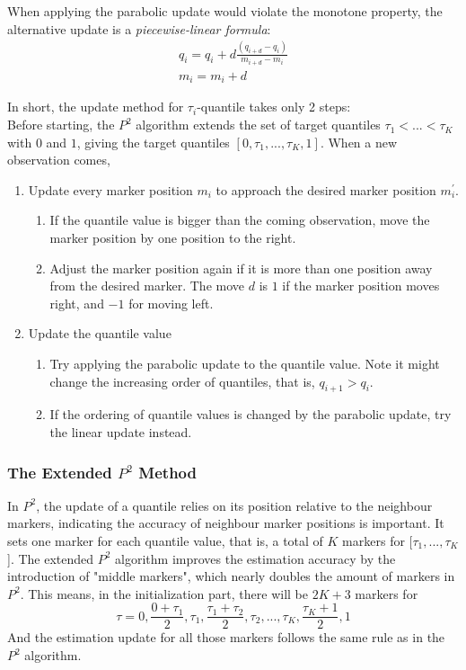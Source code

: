 When applying the parabolic update would violate the monotone property, the alternative update is a \textit{piecewise-linear formula}:
\begin{equation}
    \begin{array}{l}
    q_{i}=q_{i}+d \frac{\left(q_{i+d}-q_{i}\right)}{m_{i+d}-m_{i}} \\
    m_{i}=m_{i}+d
    \end{array}
\end{equation}

In short, the update method for $\tau_i$-quantile takes only 2 steps:\\
Before starting, the $P^2$ algorithm extends the set of target quantiles $\tau_1 <... < \tau_K$ with $0$ and $1$, giving the target quantiles $[0, \tau_1, ..., \tau_K, 1]$.
When a new observation comes,
\begin{enumerate}
    \item Update every marker position $m_i$ to approach the desired marker position $m_i^\prime$.
    \begin{enumerate}
        \item If the quantile value is bigger than the coming observation, move the marker position by one position to the right.
        \item Adjust the marker position again if it is more than one position away from the desired marker. The move $d$ is $1$ if the marker position moves right, and $-1$ for moving left.
    \end{enumerate}
    \item Update the quantile value
    \begin{enumerate}
        \item Try applying the parabolic update to the quantile value. Note it might change the increasing order of quantiles, that is, $q_{i+1} > q_{i}$.
        \item If the ordering of quantile values is changed by the parabolic update, try the linear update instead.
    \end{enumerate}
\end{enumerate}


\subsubsection{The Extended $P^2$ Method}
In $P^2$, the update of a quantile relies on its position relative to the neighbour markers, indicating the accuracy of neighbour marker positions is important. 
It sets one marker for each quantile value, that is, a total of $K$ markers for [$\tau_1, ..., \tau_K$].
The extended $P^2$ algorithm improves the estimation accuracy by the introduction of "middle markers",  which nearly doubles the amount of markers in $P^2$. 
This means, in the initialization part, there will be $2K+3$ markers for
$$
\tau = 0, \frac{0+\tau_1}{2}, \tau_1, \frac{\tau_1 + \tau_2}{2}, \tau_2, ..., \tau_{K}, \frac{\tau_K+1}{2}, 1
$$
And the estimation update for all those markers follows the same rule as in the $P^2$ algorithm.

